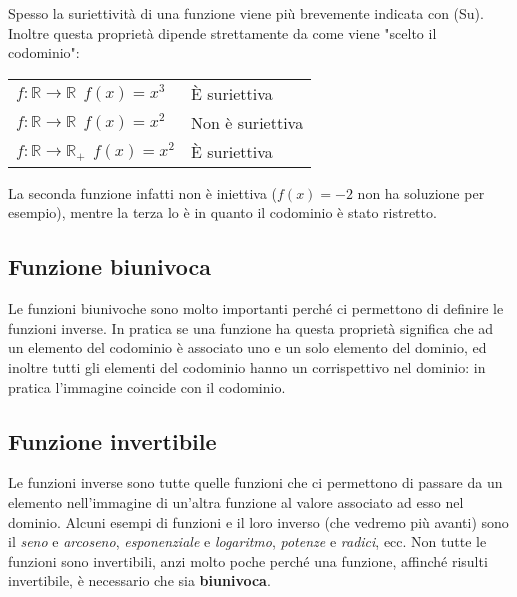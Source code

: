 Spesso la suriettività di una funzione viene più brevemente indicata con (Su). 
Inoltre questa proprietà dipende strettamente da come viene "scelto il 
codominio":

\begin{table}[H]
\centering
\begin{tabular}{ll}
$f: \mathbb{R} \to \mathbb{R}\;\, f(x) = x^3$          & È suriettiva      \\
$f: \mathbb{R} \to \mathbb{R}\;\, f(x) = x^2$        & Non è suriettiva  \\
$f: \mathbb{R} \to \mathbb{R}_{+}\;\, f(x) = x^2$ & È suriettiva     
\end{tabular}
\end{table}

La seconda funzione infatti non è iniettiva ($f(x) = -2$ non ha soluzione per 
esempio), mentre la terza lo è in quanto il codominio è stato ristretto.

\subsection{Funzione biunivoca}

Le funzioni biunivoche sono molto importanti perché ci permettono di definire 
le funzioni inverse. In pratica se una funzione ha questa proprietà significa 
che ad un elemento del codominio è associato uno e un solo elemento del 
dominio, ed inoltre tutti gli elementi del codominio hanno un corrispettivo 
nel dominio: in pratica l'immagine coincide con il codominio.

\subsection{Funzione invertibile}
Le funzioni inverse sono tutte quelle funzioni che ci permettono di passare da 
un elemento nell'immagine di un'altra funzione al valore associato ad esso nel 
dominio. Alcuni esempi di funzioni e il loro inverso (che vedremo più avanti) 
sono il \textit{seno} e \textit{arcoseno}, \textit{esponenziale} e 
\textit{logaritmo}, \textit{potenze} e \textit{radici}, ecc. Non tutte le 
funzioni sono invertibili, anzi molto poche perché una funzione, affinché 
risulti invertibile, è necessario che sia \textbf{biunivoca}.


